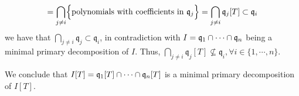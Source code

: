 \begin{problem}
\begin{enumerate}[label=(\theproblem.\arabic*),ref=\theproblem.\arabic*]
\begin{sol}
\begin{itemize}
\begin{gather*}
                    = \bigcap_{j \neq i} \Bigl\{ \text{polynomials with coefficients in } \mathfrak{q}_j \Bigr\} = \bigcap_{j \neq i} \mathfrak{q}_j[T] \subset \mathfrak{q}_i\\
                \end{gather*}
                we have that $\bigcap_{j \neq i} \mathfrak{q}_j \subset \mathfrak{q}_i$, in contradiction with $I = \mathfrak{q}_1 \cap \cdots \cap \mathfrak{q}_n$ being a minimal primary decomposition of $I$.
                Thus, $\bigcap_{j \neq i} \mathfrak{q}_j[T] \nsubseteq \mathfrak{q}_i, \forall i \in \{ 1, \cdots, n \}$.
            \end{itemize}
            We conclude that $I[T] = \mathfrak{q}_1[T] \cap \cdots \cap \mathfrak{q}_n[T]$ is a minimal primary decomposition of $I[T]$.
        \end{sol}

    \end{enumerate}
\end{problem}
